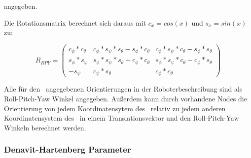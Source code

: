 angegeben.

Die Rotationsmatrix berechnet sich daraus mit $c_x=cos(x)$ und $s_x=sin(x)$ zu:

\begin{equation}
  R_{RPY}=
  \begin{pmatrix}
    c_\phi*c_\theta     
    & c_\phi*s_\psi*s_\theta-s_\phi*c_\theta
    & c_\phi*s_\psi*c_\theta-s_\phi*s_\theta\\

    s_\phi*s_\psi          
    & s_\phi*s_\psi*s_\theta+c_\phi*c_\theta
    & s_\phi*s_\psi*c_\theta-c_\phi*s_\theta\\
  
    -s_\psi    
    & c_\psi*s_\theta   
    & c_\phi*c_\theta
  
  \end{pmatrix}
\end{equation}

Alle für den \cob\ angegebenen Orientierungen in der Roboterbeschreibung sind 
als Roll-Pitch-Yaw Winkel angegeben. Außerdem kann durch vorhandene Nodes 
die Orientierung von jedem Koordinatensytem des \cob\ relativ zu jedem 
anderen Koordinatensystem des \cob\ in einem Translationsvektor und den Roll-Pitch-Yaw
Winkeln berechnet werden.


\subsubsection{Denavit-Hartenberg Parameter}
\label{ssub:Denavit-Hartenberg Parameter}

